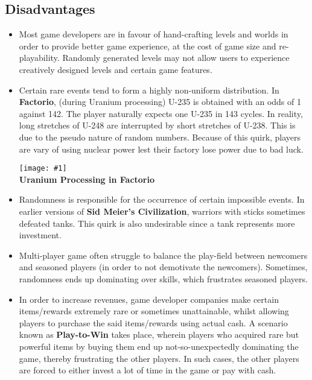 \documentclass[12pt]{article}
\newcommand{\fig}[3]{\begin{center} \texttt{[image: \#1]}\\ \textbf{#3} \end{center}}
\begin{document}
\subsection{Disadvantages}

\begin{itemize}

\item Most game developers are in favour of hand-crafting levels and worlds in order to provide better game experience, at the cost of game size and re-playability. Randomly generated levels may not allow users to experience creatively designed levels and certain game features.

\item Certain rare events tend to form a highly non-uniform distribution. In \textbf{Factorio}, (during Uranium processing) U-235 is obtained with an odds of 1 against 142. The player naturally expects one U-235 in 143 cycles. In reality, long stretches of U-248 are interrupted by short stretches of U-238. This is due to the pseudo nature of random numbers. Because of this quirk, players are vary of using nuclear power lest their factory lose power due to bad luck.

\fig{factorio_uranium.jpg}{0.2}{Uranium Processing in Factorio}

\item Randomness is responsible for the occurrence of certain impossible events. In earlier versions of \textbf{Sid Meier's Civilization}, warriors with sticks sometimes defeated tanks. This quirk is also undesirable since a tank represents more investment.

\item Multi-player game often struggle to balance the play-field between newcomers and seasoned players (in order to not demotivate the newcomers). Sometimes, randomness ends up dominating over skills, which frustrates seasoned players.

\item In order to increase revenues, game developer companies make certain items/rewards extremely rare or sometimes unattainable, whilst allowing players to purchase the said items/rewards using actual cash. A scenario known as \textbf{Play-to-Win} takes place, wherein players who acquired rare but powerful items by buying them end up not-so-unexpectedly dominating the game, thereby frustrating the other players. In such cases, the other players are forced to either invest a lot of time in the game or pay with cash.

\end{itemize}
\end{document}
